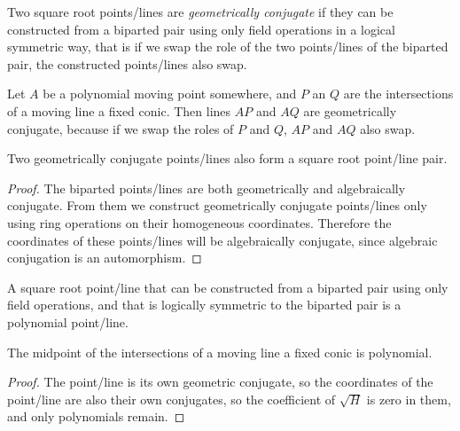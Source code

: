 \documentclass[a4paper]{article}
\begin{document}
\begin{definition}
    Two square root points/lines are \textit{geometrically conjugate} if they can be constructed from a biparted pair using only field operations in a logical symmetric way, that is if we swap the role of the two points/lines of the biparted pair, the constructed points/lines also swap.
\end{definition}
\begin{example}
    Let $A$ be a polynomial moving point somewhere, and $P$ an $Q$ are the intersections of a moving line a fixed conic. Then lines $AP$ and $AQ$ are geometrically conjugate, because if we swap the roles of $P$ and $Q$, $AP$ and $AQ$ also swap.
\end{example}

\begin{lemma}
    Two geometrically conjugate points/lines also form a square root point/line pair.
\end{lemma}

\begin{proof}
    The biparted points/lines are both geometrically and algebraically conjugate. From them we construct geometrically conjugate points/lines only using ring operations on their homogeneous coordinates. Therefore the coordinates of these points/lines will be algebraically conjugate, since algebraic conjugation is an automorphism.
\end{proof}

\begin{lemma}
    A square root point/line that can be constructed from a biparted pair using only field operations, and that is logically symmetric to the biparted pair is a polynomial point/line.
\end{lemma}
\begin{example}
    The midpoint of the intersections of a moving line a fixed conic is polynomial.
\end{example}
\begin{proof}
    The point/line is its own geometric conjugate, so the coordinates of the point/line are also their own conjugates, so the coefficient of $\sqrt{H}$ is zero in them, and only polynomials remain.
\end{proof}
\end{document}
